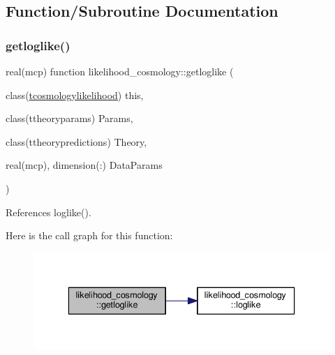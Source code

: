 \subsection{Function/\+Subroutine Documentation}
\mbox{\label{namespacelikelihood__cosmology_a28ab9c3076608cb7b1550060aa9b450b}} 
\subsubsection{\texorpdfstring{getloglike()}{getloglike()}}
{\footnotesize\ttfamily real(mcp) function likelihood\+\_\+cosmology\+::getloglike (\begin{DoxyParamCaption}\item[{class(\mbox{\hyperlink{structlikelihood__cosmology_1_1tcosmologylikelihood}{tcosmologylikelihood}})}]{this,  }\item[{class(ttheoryparams)}]{Params,  }\item[{class(ttheorypredictions)}]{Theory,  }\item[{real(mcp), dimension(\+:)}]{Data\+Params }\end{DoxyParamCaption})\hspace{0.3cm}{\ttfamily [private]}}



References loglike().

Here is the call graph for this function\+:
\nopagebreak
\begin{figure}[H]
\begin{center}
\leavevmode
\includegraphics[width=336pt]{namespacelikelihood__cosmology_a28ab9c3076608cb7b1550060aa9b450b_cgraph}
\end{center}
\end{figure}
\mbox{\label{namespacelikelihood__cosmology_ad4c3f93cdd27d0b291676092a4e2023b}} 
